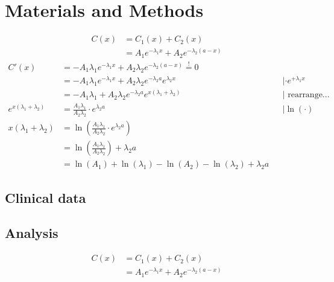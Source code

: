 

\section{Materials and Methods}
\label{section2}
\kant[14-15]
\begin{align*}
C(x) &= C_1(x) + C_2(x) \\
&= A_1e^{-\lambda_1 x} + A_2e^{-\lambda_2 (a-x)}
\end{align*}
\kant[19]\vspace{-0.5cm}
\begin{align*}
C'(x) &= -A_1\lambda_1 e^{-\lambda_1 x} + A_2 \lambda_2 e^{-\lambda_2 (a-x)} \stackrel{!}{=} 0\\
 &= -A_1\lambda_1 e^{-\lambda_1 x} + A_2 \lambda_2 e^{-\lambda_2 a} e^{\lambda_2 x} && | \cdot e^{+\lambda_1 x}\\
 &= -A_1\lambda_1 + A_2 \lambda_2 e^{-\lambda_2 a} e^{x (\lambda_1+\lambda_2)} && | \text{ rearrange...} \\
 e^{x(\lambda_1+\lambda_2)} &= \frac{A_1\lambda_1}{A_2\lambda_2}\cdot e^{\lambda_2 a} &&|\ln(\cdot)\\
x(\lambda_1 + \lambda_2) &= \ln\left(\frac{A_1\lambda_1}{A_2\lambda_2}\cdot e^{\lambda_2 a}\right)\\
 &= \ln\left(\frac{A_1\lambda_1}{A_2\lambda_2}\right) + \lambda_2 a \\
 &= \ln(A_1) + \ln(\lambda_1) - \ln(A_2) - \ln(\lambda_2) + \lambda_2 a
\end{align*}


\subsection{Clinical data}
\kant[14-16]
\subsection{Analysis}
\kant[45]
\begin{align*}
C(x) &= C_1(x) + C_2(x) \\
&= A_1e^{-\lambda_1 x} + A_2e^{-\lambda_2 (a-x)}
\end{align*}

\kant[45]


